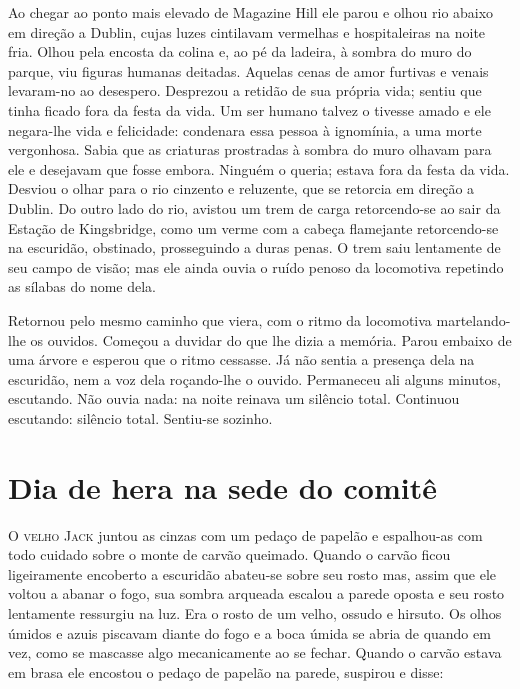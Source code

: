 Ao chegar ao ponto mais elevado de Magazine Hill ele parou e olhou rio abaixo
em direção a Dublin, cujas luzes cintilavam vermelhas e hospitaleiras na noite
fria.  Olhou pela encosta da colina e, ao pé da ladeira, à sombra do muro do
parque, viu figuras humanas deitadas.  Aquelas cenas de amor furtivas e venais
levaram-no ao desespero.  Desprezou a retidão de sua própria vida; sentiu que
tinha ficado fora da festa da vida.  Um ser humano talvez o tivesse amado e ele
negara-lhe vida e felicidade: condenara essa pessoa à ignomínia, a uma morte
vergonhosa.  Sabia que as criaturas prostradas à sombra do muro olhavam para
ele e desejavam que fosse embora.  Ninguém o queria; estava fora da festa da
vida.  Desviou o olhar para o rio cinzento e reluzente, que se retorcia em
direção a Dublin.  Do outro lado do rio, avistou um trem de carga retorcendo-se
ao sair da Estação de Kingsbridge, como um verme com a cabeça flamejante
retorcendo-se na escuridão, obstinado, prosseguindo a duras penas.  O trem saiu
lentamente de seu campo de visão; mas ele ainda ouvia o ruído penoso da
locomotiva repetindo as sílabas do nome dela.

Retornou pelo mesmo caminho que viera, com o ritmo da locomotiva martelando-lhe
os ouvidos.  Começou a duvidar do que lhe dizia a memória.  Parou embaixo de
uma árvore e esperou que o ritmo cessasse.  Já não sentia a presença dela na
escuridão, nem a voz dela roçando-lhe o ouvido.  Permaneceu ali alguns minutos,
escutando.  Não ouvia nada: na noite reinava um silêncio total.  Continuou
escutando: silêncio total.  Sentiu-se sozinho.


\chapter{Dia de hera na sede do comitê}

\textsc{O velho Jack} juntou as cinzas com um pedaço de papelão e espalhou-as
com todo cuidado sobre o monte de carvão queimado.  Quando o carvão ficou
ligeiramente encoberto a escuridão abateu-se sobre seu rosto mas, assim que ele
voltou a abanar o fogo, sua sombra arqueada escalou a parede oposta e seu rosto
lentamente ressurgiu na luz.  Era o rosto de um velho, ossudo e hirsuto.  Os
olhos úmidos e azuis piscavam diante do fogo e a boca úmida se abria de quando
em vez, como se mascasse algo mecanicamente ao se fechar.  Quando o carvão
estava em brasa ele encostou o pedaço de papelão na parede, suspirou e disse:

